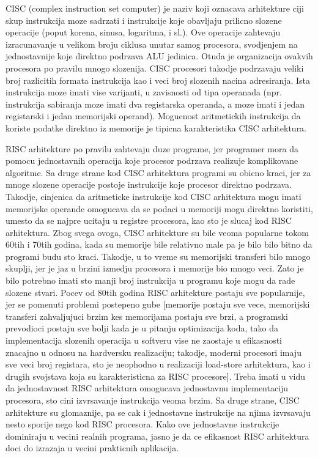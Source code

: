 \documentclass[12pt,oneside]{memoir}
\begin{document}
CISC (complex instruction set computer) je naziv koji oznacava arhitekture ciji skup instrukcija 
moze sadrzati i instrukcije koje obavljaju prilicno slozene operacije (poput korena, sinusa,
logaritma, i sl.). Ove operacije zahtevaju izracunavanje u velikom broju ciklusa unutar samog 
procesora, svodjenjem na jednostavnije koje direktno podrzava ALU jedinica. Otuda je organizacija 
ovakvih procesora po pravilu mnogo slozenija. CISC procesori takodje podrzavaju veliki broj 
razlicitih formata instrukcija kao i veci broj slozenih nacina adresiranja. Ista instrukcija moze 
imati vise varijanti, u zavisnosti od tipa operanada (npr. instrukcija sabiranja moze imati dva 
registarska operanda, a moze imati i jedan registarski i jedan memorijski operand). Mogucnost 
aritmetickih instrukcija da koriste podatke direktno iz memorije je tipicna
karakteristika CISC arhitektura. 

RISC arhitekture po pravilu zahtevaju duze programe, jer programer mora da pomocu jednostavnih 
operacija koje procesor podrzava realizuje komplikovane algoritme. Sa druge strane kod CISC 
arhitektura programi su obicno kraci, jer za mnoge slozene operacije postoje instrukcije koje 
procesor direktno podrzava. Takodje, cinjenica da aritmeticke instrukcije kod CISC arhitektura 
mogu imati memorijske operande omogucava da se podaci u memoriji mogu direktno koristiti, umesto 
da se najpre ucitaju u registre procesora, kao sto je slucaj kod RISC arhitektura. Zbog
svega ovoga, CISC arhitekture su bile veoma popularne tokom 60tih i 70tih godina, kada su 
memorije bile relativno male pa je bilo bilo bitno da programi budu sto kraci. Takodje, u to 
vreme su memorijski transferi bilo mnogo skuplji, jer je jaz u brzini izmedju procesora i 
memorije bio mnogo veci. Zato je bilo potrebno imati sto manji broj instrukcija u programu koje 
mogu da rade slozene stvari. Pocev od 80tih godina RISC arhitekture postaju sve popularnije, jer
se pomenuti problemi postepeno gube [memorije postaju sve vece, memorijski transferi zahvaljujuci 
brzim kes memorijama postaju sve brzi, a programski prevodioci postaju sve bolji kada je u pitanju
optimizacija koda, tako da implementacija slozenih operacija u softveru vise ne zaostaje u 
efikasnosti znacajno u odnosu na hardversku realizaciju; takodje, moderni procesori imaju sve veci
broj registara, sto je neophodno u realizaciji load-store arhitektura, kao i drugih svojstava 
koja su karakteristicna za RISC procesore]. Treba imati u vidu da jednostavnost RISC arhitektura
omogucava jednostavnu implementaciju procesora, sto cini izvrsavanje instrukcija veoma brzim. Sa 
druge strane, CISC arhitekture su glomaznije, pa se cak i jednostavne instrukcije na
njima izvrsavaju nesto sporije nego kod RISC procesora. Kako ove jednostavne instrukcije 
dominiraju u vecini realnih programa, jasno je da ce efikasnost RISC arhitektura doci do izrazaja 
u vecini prakticnih aplikacija.
\end{document}
